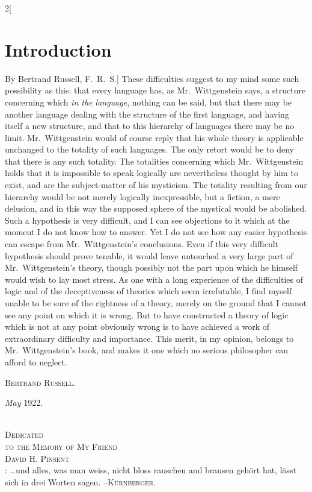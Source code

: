 \documentclass[oneside,openany,12pt]{book}
\newcommand{\germph}[1]{\so{#1}} %
\begin{document}
\begin{multicols}{2}[\section*{Introduction}By Bertrand Russell, F.\ R.\ S.]
These difficulties suggest to my mind some such possibility as this: that every language has, as Mr.\ Wittgenstein says, a structure concerning which \emph{in the language}, nothing can be said, but that there may be another language dealing with the structure of the first language, and having itself a new structure, and that to this hierarchy of languages there may be no limit. Mr.\ Wittgenstein would of course reply that his whole theory is applicable unchanged to the totality of such languages. The only retort would be to deny that there is any such totality. The totalities concerning which Mr.\ Wittgenstein holds that it is impossible to speak logically are nevertheless thought by him to exist, and are the subject-matter of his mysticism. The totality resulting from our hierarchy would be not merely logically inexpressible, but a fiction, a mere delusion, and in this way the supposed sphere of the mystical would be abolished. Such a hypothesis is very difficult, and I can see objections to it which at the moment I do not know how to answer. Yet I do not see how any easier hypothesis can escape from Mr.\ Wittgenstein's conclusions. Even if this very difficult hypothesis should prove tenable, it would leave untouched a very large part of Mr.\ Wittgenstein's theory, though possibly not the part upon which he himself would wish to lay most stress. As one with a long experience of the difficulties of logic and of the deceptiveness of theories which seem irrefutable, I find myself unable to be sure of the rightness of a theory, merely on the ground that I cannot see any point on which it is wrong. But to have constructed a theory of logic which is not at any point obviously wrong is to have achieved a work of extraordinary difficulty and importance. This merit, in my opinion, belongs to Mr.\ Wittgenstein's book, and makes it one which no serious philosopher can afford to neglect.

\hfill\textsc{Bertrand Russell.}\phantom{xxx} %


\textit{May} 1922.
\end{multicols}
\clearpage{}\thispagestyle{empty}
\begin{center}
\vspace*{50pt}{\Huge Tractatus Logico-Philosophicus}\\[150.0pt]
{\textsc{Dedicated}}\\
{\textsc{to the Memory of My Friend}}\\[12.0pt]
{\Large\textsc{David H. Pinsent}}\\[150.0pt]
{\germph{Motto}: \ldots und alles, was man weiss, nicht bloss rauschen and brausen geh{\"o}rt hat, l{\"a}sst sich in drei Worten sagen.}
{\quad\textsc{--K{\"u}rnberger.}}
\end{center}
\end{document}
